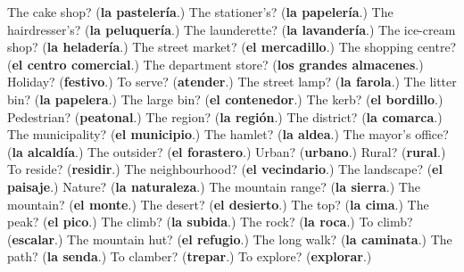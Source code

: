 \begin{tcolorbox}[breakable,colback=teal!4,colframe=teal!35!black,title={Before you move on}]
The cake shop? (\textbf{la pastelería}.) The stationer’s? (\textbf{la papelería}.) The hairdresser’s? (\textbf{la peluquería}.) The launderette? (\textbf{la lavandería}.) The ice-cream shop? (\textbf{la heladería}.) The street market? (\textbf{el mercadillo}.) The shopping centre? (\textbf{el centro comercial}.) The department store? (\textbf{los grandes almacenes}.) Holiday? (\textbf{festivo}.) To serve? (\textbf{atender}.) The street lamp? (\textbf{la farola}.) The litter bin? (\textbf{la papelera}.) The large bin? (\textbf{el contenedor}.) The kerb? (\textbf{el bordillo}.) Pedestrian? (\textbf{peatonal}.) The region? (\textbf{la región}.) The district? (\textbf{la comarca}.) The municipality? (\textbf{el municipio}.) The hamlet? (\textbf{la aldea}.) The mayor’s office? (\textbf{la alcaldía}.) The outsider? (\textbf{el forastero}.) Urban? (\textbf{urbano}.) Rural? (\textbf{rural}.) To reside? (\textbf{residir}.) The neighbourhood? (\textbf{el vecindario}.) The landscape? (\textbf{el paisaje}.) Nature? (\textbf{la naturaleza}.) The mountain range? (\textbf{la sierra}.) The mountain? (\textbf{el monte}.) The desert? (\textbf{el desierto}.) The top? (\textbf{la cima}.) The peak? (\textbf{el pico}.) The climb? (\textbf{la subida}.) The rock? (\textbf{la roca}.) To climb? (\textbf{escalar}.) The mountain hut? (\textbf{el refugio}.) The long walk? (\textbf{la caminata}.) The path? (\textbf{la senda}.) To clamber? (\textbf{trepar}.) To explore? (\textbf{explorar}.)
\end{tcolorbox}
